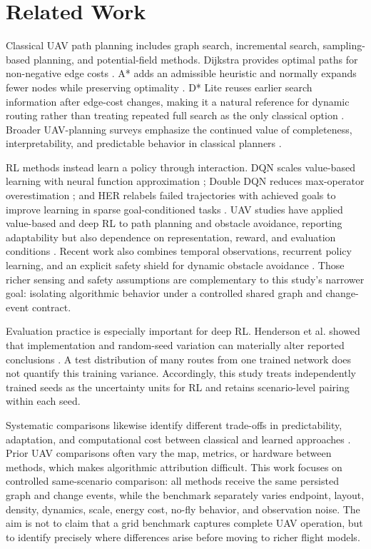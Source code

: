 \section{Related Work}
\label{sec:related-work}

Classical UAV path planning includes graph search, incremental search,
sampling-based planning, and potential-field methods. Dijkstra provides optimal
paths for non-negative edge costs \cite{dijkstra1959note}. A* adds an admissible
heuristic and normally
expands fewer nodes while preserving optimality \cite{hart1968astar}. D* Lite
reuses earlier search information after edge-cost changes, making it a natural
reference for dynamic routing rather than treating repeated full search as the
only classical option \cite{koenig2005dstarlite}. Broader UAV-planning surveys
emphasize the continued value of completeness, interpretability, and predictable
behavior in classical planners \cite{ghambari2024survey,venu2025comprehensive}.

RL methods instead learn a policy through interaction. DQN scales value-based
learning with neural function approximation \cite{mnih2015human}; Double DQN
reduces max-operator overestimation \cite{vanhasselt2016double}; and HER
relabels failed trajectories with achieved goals to improve learning in sparse
goal-conditioned tasks \cite{andrychowicz2017her}. UAV studies have applied
value-based and deep RL to path planning and obstacle avoidance, reporting
adaptability but also dependence on representation, reward, and evaluation
conditions \cite{tu2023uav,guo2023uav,zhao2022path,rocha2024dynamic}. Recent
work also combines temporal observations, recurrent policy learning, and an
explicit safety shield for dynamic obstacle avoidance
\cite{liu2026temporal}. Those richer sensing and safety assumptions are
complementary to this study's narrower goal: isolating algorithmic behavior
under a controlled shared graph and change-event contract.

Evaluation practice is especially important for deep RL. Henderson et al.
showed that implementation and random-seed variation can materially alter
reported conclusions \cite{henderson2018deep}. A test distribution of many
routes from one trained network does not quantify this training variance.
Accordingly, this study treats independently trained seeds as the uncertainty
units for RL and retains scenario-level pairing within each seed.

Systematic comparisons likewise identify different trade-offs in
predictability, adaptation, and computational cost between classical and
learned approaches \cite{mannan2023classical}. Prior UAV comparisons often vary
the map, metrics, or hardware between methods,
which makes algorithmic attribution difficult. This work focuses on controlled
same-scenario comparison: all methods receive the same persisted graph and
change events, while the benchmark separately varies endpoint, layout,
density, dynamics, scale, energy cost, no-fly behavior, and observation noise.
The aim is not to claim that a grid benchmark captures complete UAV operation,
but to identify precisely where differences arise before moving to richer
flight models.
